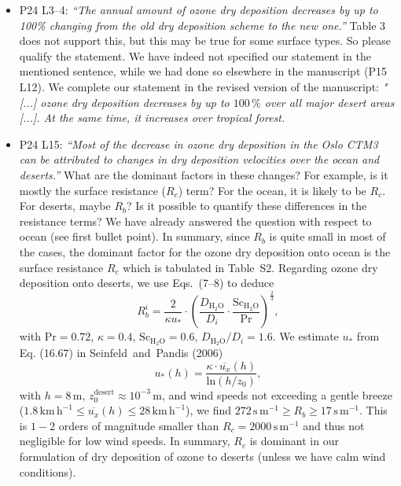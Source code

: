 \documentclass{scrartcl}
\begin{document}
\begin{itemize}
\item {\color{blue}  P24 L3--4: \emph{“The annual amount of ozone dry deposition decreases by up
to 100\% changing from the old dry deposition scheme to the new one.”} Table 3 does
not support this, but this may be true for some surface types. So please qualify the
statement.}
  We have indeed not specified our statement in the mentioned sentence, while we had done so elsewhere in the manuscript (P15 L12). We complete our statement in the revised version of the manuscript:
  \emph{"[...] ozone dry deposition decreases by up to $100\,\%$ over all major desert areas [...]. At the same time, it increases over tropical forest.}
  
\item {\color{blue}  P24 L15: \emph{“Most of the decrease in ozone dry deposition in the Oslo CTM3
can be attributed to changes in dry deposition velocities over the ocean and deserts.”}
What are the dominant factors in these changes? For example, is it mostly the surface
resistance ($R_c$) term? For the ocean, it is likely to be $R_c$. For deserts, maybe $R_b$? Is it
possible to quantify these differences in the resistance terms?}
  We have already answered the question with respect to ocean (see first bullet point). In summary, since $R_b$ is quite small in most of the cases, the dominant factor for the ozone dry deposition onto ocean is the surface resistance $R_c$ which is tabulated in Table~S2. Regarding ozone dry deposition onto deserts, we use Eqs.~(7--8) to deduce
  \begin{equation}
    R_b^i = \frac{2}{\kappa u_*} \cdot \left(\frac{D_\mathrm{H_2O}}{D_i} \cdot \frac{\mathrm{Sc}_\mathrm{H_2O}}{\mathrm{Pr}}\right)^{\frac{2}{3}},
  \end{equation}
  with $\mathrm{Pr}=0.72$, $\kappa=0.4$, $\mathrm{Sc}_\mathrm{H_2O} = 0.6$, $D_\mathrm{H_2O}/D_i = 1.6$.
  We estimate $u_*$ from Eq. (16.67) in Seinfeld~and~Pandis (2006)
  \begin{equation}
    u_*(h) = \frac{\kappa\cdot \overline{u_x}(h)}{\mathrm{ln}(h/z_0)},
  \end{equation}
  with $h = 8\,\mathrm{m}$, $z_0^\mathrm{desert}\approx 10^{-3}\,\mathrm{m}$, and wind speeds not exceeding a gentle breeze ($1.8\,\mathrm{km\,h^{-1}} \leq \overline{u_x}(h) \leq 28\,\mathrm{km\,h^{-1}}$), we find $272\,\mathrm{s\,m^{-1}} \geq R_b \geq 17\,\mathrm{s\,m^{-1}}$. This is $1-2$ orders of magnitude smaller than $R_c = 2000\,\mathrm{s\,m^{-1}}$ and thus not negligible for low wind speeds. In summary, $R_c$ is dominant in our formulation of dry deposition of ozone to deserts (unless we have calm wind conditions).
  \emph{}
  

\end{itemize}
\end{document}

